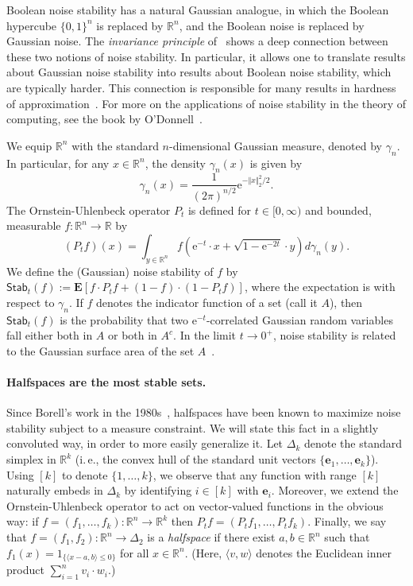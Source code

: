 \documentclass[11pt]{article}
\numberwithin{equation}{section}
\theoremstyle{definition}
\theoremstyle{plain}
\newcommand{\R}{\mathbb R}
\newcommand{\eee}{\mathrm e}
\newcommand{\ie}{i.\,e.}
\begin{document}
Boolean noise stability has a natural Gaussian analogue, in which
the Boolean hypercube $\{0, 1\}^n$ is replaced by $\R^n$, and the Boolean
noise is replaced by Gaussian noise.  The \emph{invariance principle} of~\cite{MOO10}
%
shows     %
a deep connection between these two notions of noise
stability. In particular, it allows one to translate results about Gaussian
noise stability into results about Boolean noise stability, which
are typically harder. This connection is responsible for many results
in hardness of approximation~\cite{KKMO07}. For more on the applications of
noise stability in the theory of computing, see the book by O'Donnell~\cite{ODonnell:book}.

We equip $\mathbb{R}^n$ with the standard
$n$-dimensional Gaussian measure, denoted by $\gamma_n$.
In particular, for any $x \in \mathbb{R}^n$, the density $\gamma_n(x)$ is given by 
\[
\gamma_n(x) = \frac{1}{(2\pi)^{n/2}}  \eee^{-{\Vert x \Vert_2
^2}/{2}}.
\]
 The Ornstein-Uhlenbeck operator $P_t$ is defined for $t \in [0, \infty)$ and bounded, measurable $f: \mathbb{R}^n \rightarrow \mathbb{R}$ by
$$
(P_t f)(x) = \int_{y \in \mathbb{R}^n} f(\eee^{-t} \cdot x + \sqrt{1- \eee^{-2t}} \cdot y) d \gamma_n(y).
$$
We define the (Gaussian) noise stability of $f$ by $\mathsf{Stab}_t(f) :=
\mathbf{E}[f \cdot P_t f + (1-f) \cdot (1 - P_t f)]$, where the expectation is with respect to
$\gamma_n$. If $f$ denotes the indicator function of a set (call it
$A$), then $\mathsf{Stab}_t(f)$ is the probability that two
$\eee^{-t}$-correlated Gaussian random variables fall either both in $A$ or both in $A^c$. In
the limit $t \rightarrow 0^+$, noise stability is related to the Gaussian
surface area of the set $A$~\cite{Ledoux:94}.

\paragraph{Halfspaces are the most stable sets.}
Since Borell's work in the 1980s~\cite{Borell:85},
halfspaces have been known to
maximize noise stability subject to a measure constraint.
We will state this
fact in a slightly convoluted way, in order to more easily generalize it.  Let
$\Delta_k$ denote the standard simplex in $\R^k$ (\ie, the convex hull
of  the standard unit vectors $\{\mathbf{e}_1, \ldots, \mathbf{e}_k\}$).
Using $[k]$ to denote $\{1,\ldots, k\}$, we observe that any function with range $[k]$ naturally embeds in $\Delta_k$ by identifying $i
\in [k]$ with $\mathbf{e}_i$. 
Moreover, we extend the Ornstein-Uhlenbeck operator to act on vector-valued
functions in the obvious way: if $f = (f_1, \dots, f_k): \R^n \to \R^k$
then $P_t f = (P_t f_1, \dots, P_t f_k)$.
Finally, we say that $f = (f_1, f_2): \R^n \to \Delta_2$ is a \emph{halfspace} if
there exist $a, b \in \R^n$ such that $f_1(x) = 1_{\{\langle x - a, b\rangle \le 0\}}$
for all $x \in \R^n$.
(Here, $\langle v, w \rangle$ denotes
the Euclidean inner product $\sum_{i=1}^n v_i \cdot w_i$.)
\end{document}
